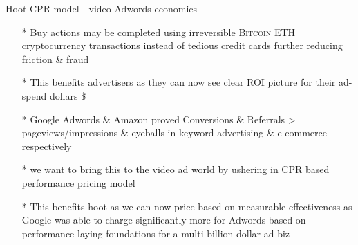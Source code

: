 \documentclass[12pt]{beamer}
\begin{document}
\begin{frame}[t]{Hoot CPR model - video Adwords economics}
\begin{itemize}[<+-| alert@+>]

\item[*]Buy actions may be completed using irreversible  \textsc{Bitcoin ETH} cryptocurrency transactions instead of tedious credit cards further reducing friction \& fraud
\item[*]This benefits advertisers as they can now see clear ROI picture for their ad-spend dollars \$
\item[*]Google Adwords \& Amazon proved Conversions \& Referrals > pageviews/impressions \& eyeballs in keyword advertising \& e-commerce respectively
\item[*]we want to bring this to the video ad world by ushering in CPR based performance pricing model
\item[*]This benefits hoot as we can now price based on measurable effectiveness as Google was able to charge significantly more for Adwords based on performance laying foundations for a multi-billion dollar ad biz

\end{itemize}
\end{frame}
\end{document}
